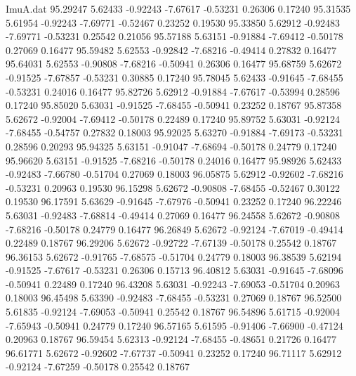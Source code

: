 \begin{filecontents}{ImuA.dat}
  95.29247    5.62433   -0.92243   -7.67617   -0.53231    0.26306    0.17240
  95.31535    5.61954   -0.92243   -7.69771   -0.52467    0.23252    0.19530
  95.33850    5.62912   -0.92483   -7.69771   -0.53231    0.25542    0.21056
  95.57188    5.63151   -0.91884   -7.69412   -0.50178    0.27069    0.16477
  95.59482    5.62553   -0.92842   -7.68216   -0.49414    0.27832    0.16477
  95.64031    5.62553   -0.90808   -7.68216   -0.50941    0.26306    0.16477
  95.68759    5.62672   -0.91525   -7.67857   -0.53231    0.30885    0.17240
  95.78045    5.62433   -0.91645   -7.68455   -0.53231    0.24016    0.16477
  95.82726    5.62912   -0.91884   -7.67617   -0.53994    0.28596    0.17240
  95.85020    5.63031   -0.91525   -7.68455   -0.50941    0.23252    0.18767
  95.87358    5.62672   -0.92004   -7.69412   -0.50178    0.22489    0.17240
  95.89752    5.63031   -0.92124   -7.68455   -0.54757    0.27832    0.18003
  95.92025    5.63270   -0.91884   -7.69173   -0.53231    0.28596    0.20293
  95.94325    5.63151   -0.91047   -7.68694   -0.50178    0.24779    0.17240
  95.96620    5.63151   -0.91525   -7.68216   -0.50178    0.24016    0.16477
  95.98926    5.62433   -0.92483   -7.66780   -0.51704    0.27069    0.18003
  96.05875    5.62912   -0.92602   -7.68216   -0.53231    0.20963    0.19530
  96.15298    5.62672   -0.90808   -7.68455   -0.52467    0.30122    0.19530
  96.17591    5.63629   -0.91645   -7.67976   -0.50941    0.23252    0.17240
  96.22246    5.63031   -0.92483   -7.68814   -0.49414    0.27069    0.16477
  96.24558    5.62672   -0.90808   -7.68216   -0.50178    0.24779    0.16477
  96.26849    5.62672   -0.92124   -7.67019   -0.49414    0.22489    0.18767
  96.29206    5.62672   -0.92722   -7.67139   -0.50178    0.25542    0.18767
  96.36153    5.62672   -0.91765   -7.68575   -0.51704    0.24779    0.18003
  96.38539    5.62194   -0.91525   -7.67617   -0.53231    0.26306    0.15713
  96.40812    5.63031   -0.91645   -7.68096   -0.50941    0.22489    0.17240
  96.43208    5.63031   -0.92243   -7.69053   -0.51704    0.20963    0.18003
  96.45498    5.63390   -0.92483   -7.68455   -0.53231    0.27069    0.18767
  96.52500    5.61835   -0.92124   -7.69053   -0.50941    0.25542    0.18767
  96.54896    5.61715   -0.92004   -7.65943   -0.50941    0.24779    0.17240
  96.57165    5.61595   -0.91406   -7.66900   -0.47124    0.20963    0.18767
  96.59454    5.62313   -0.92124   -7.68455   -0.48651    0.21726    0.16477
  96.61771    5.62672   -0.92602   -7.67737   -0.50941    0.23252    0.17240
  96.71117    5.62912   -0.92124   -7.67259   -0.50178    0.25542    0.18767

\end{filecontents}
